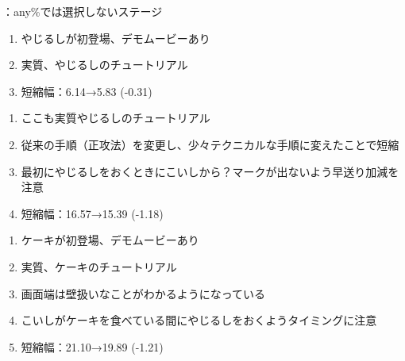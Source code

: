 

%

{\TBW}：any\%では選択しないステージ



\begin{enumerate}[label={\sarrow}]
\item やじるしが初登場、デモムービーあり
\item 実質、やじるしのチュートリアル
\item 短縮幅：6.14→5.83 (-0.31)
\end{enumerate}



\begin{enumerate}[label={\sarrow}]
\item ここも実質やじるしのチュートリアル
\item 従来の手順（正攻法）を変更し、少々テクニカルな手順に変えたことで短縮
\item 最初にやじるしをおくときにこいしから？\hspace{0pt}マークが出ないよう早送り加減を注意
\item 短縮幅：16.57→15.39 (-1.18)
\end{enumerate}



\begin{enumerate}[label={\sarrow}]
\item ケーキが初登場、デモムービーあり
\item 実質、ケーキのチュートリアル
\item 画面端は壁扱いなことがわかるようになっている
\item こいしがケーキを食べている間にやじるしをおくようタイミングに注意
\item 短縮幅：21.10→19.89 (-1.21)
\end{enumerate}



